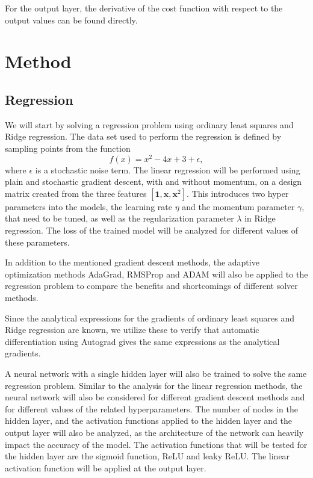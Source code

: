 \documentclass[12pt]{article}
\begin{document}
For the output layer, the derivative of the cost function with respect to the output values can be found directly.


\section{Method} \label{sec:method}
\subsection{Regression}
We will start by solving a regression problem using ordinary least squares and Ridge regression. The data set used to perform the regression is defined by sampling points from the function
\begin{equation}
    f(x) = x^2 - 4x + 3 + \epsilon,
\end{equation}
where $\epsilon$ is a stochastic noise term. The linear regression will be performed using plain and stochastic gradient descent, with and without momentum, on a design matrix created from the three features $[\boldsymbol{1}, \boldsymbol{x}, \boldsymbol{x}^2]$. This introduces two hyper parameters into the models, the learning rate $\eta$ and the momentum parameter $\gamma$, that need to be tuned, as well as the regularization parameter $\lambda$ in Ridge regression. The loss of the trained model will be analyzed for different values of these parameters. 

In addition to the mentioned gradient descent methods, the adaptive optimization methods AdaGrad, RMSProp and ADAM will also be applied to the regression problem to compare the benefits and shortcomings of different solver methods.

Since the analytical expressions for the gradients of ordinary least squares and Ridge regression are known, we utilize these to verify that automatic differentiation using Autograd gives the same expressions as the analytical gradients.

A neural network with a single hidden layer will also be trained to solve the same regression problem. Similar to the analysis for the linear regression methods, the neural network will also be considered for different gradient descent methods and for different values of the related hyperparameters. The number of nodes in the hidden layer, and the activation functions applied to the hidden layer and the output layer will also be analyzed, as the architecture of the network can heavily impact the accuracy of the model. The activation functions that will be tested for the hidden layer are the sigmoid function, ReLU and leaky ReLU. The linear activation function will be applied at the output layer.
\end{document}
